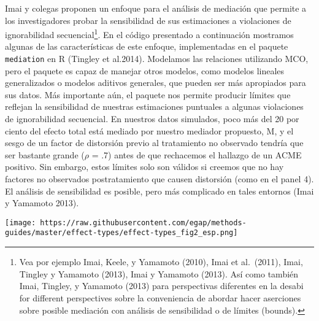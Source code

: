 \documentclass[
]{article}
\begin{document}
Imai y colegas proponen un enfoque para el análisis de mediación que
permite a los investigadores probar la sensibilidad de sus estimaciones
a violaciones de ignorabilidad secuencial\footnote{Vea por ejemplo Imai,
  Keele, y Yamamoto (2010), Imai et al.~(2011), Imai, Tingley y Yamamoto
  (2013), Imai y Yamamoto (2013). Así como también Imai, Tingley, y
  Yamamoto (2013) para perspectivas diferentes en la desabi for
  different perspectives sobre la conveniencia de abordar hacer
  aserciones sobre posible mediación con análisis de sensibilidad o de
  límites (bounds).}. En el código presentado a continuación mostramos
algunas de las características de este enfoque, implementadas en el
paquete \texttt{mediation} en R (Tingley et al.2014). Modelamos las
relaciones utilizando MCO, pero el paquete es capaz de manejar otros
modelos, como modelos lineales generalizados o modelos aditivos
generales, que pueden ser más apropiados para sus datos. Más importante
aún, el paquete nos permite producir límites que reflejan la
sensibilidad de nuestras estimaciones puntuales a algunas violaciones de
ignorabilidad secuencial. En nuestros datos simulados, poco más del 20
por ciento del efecto total está mediado por nuestro mediador propuesto,
M, y el sesgo de un factor de distorsión previo al tratamiento no
observado tendría que ser bastante grande (\(\rho\) = .7) antes de que
rechacemos el hallazgo de un ACME positivo. Sin embargo, estos límites
solo son válidos si creemos que no hay factores no observados
postratamiento que causen distorsión (como en el panel 4). El análisis
de sensibilidad es posible, pero más complicado en tales entornos (Imai
y Yamamoto 2013).

\texttt{[image: https://raw.githubusercontent.com/egap/methods-guides/master/effect-types/effect-types\_fig2\_esp.png]}
\end{document}
